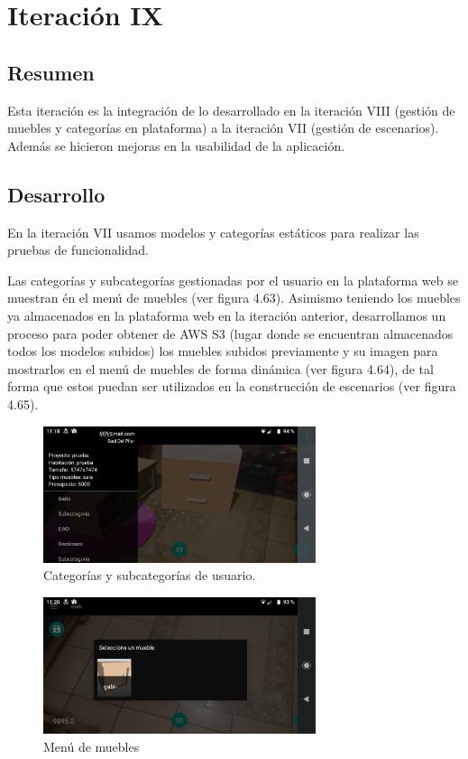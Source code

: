 \section{Iteración IX}
\subsection{Resumen}
Esta iteración es la integración de lo desarrollado en la iteración VIII (gestión de muebles y categorías en plataforma) a la iteración VII (gestión de escenarios). Además se hicieron mejoras en la usabilidad de la aplicación.

\subsection{Desarrollo}
En la iteración VII usamos modelos y categorías estáticos para realizar las pruebas de funcionalidad.\par
Las categorías y subcategorías gestionadas por el usuario en la plataforma web se muestran én el menú de muebles (ver figura 4.63). Asimismo teniendo los muebles ya almacenados en la plataforma web en la iteración anterior, desarrollamos un proceso para poder obtener de AWS S3 (lugar donde se encuentran almacenados todos los modelos subidos) los muebles subidos previamente y su imagen para mostrarlos en el menú de muebles de forma dinámica (ver figura 4.64), de tal forma que estos puedan ser utilizados en la construcción de escenarios (ver figura 4.65).

\clearpage
\begin{figure}[h!]
		\centering
		\includegraphics[width=8cm,height=4cm]{imagenes/desarrollo/app/categories.png}
		\caption{Categorías y subcategorías de usuario.}
		\label{fig:appmenucat}
\end{figure}

\begin{figure}[h!]
	\centering
	\includegraphics[width=8cm,height=4cm]{imagenes/desarrollo/app/menumuebles.png}
	\caption{Menú de muebles}
	\label{fig:appmenu}
\end{figure}

